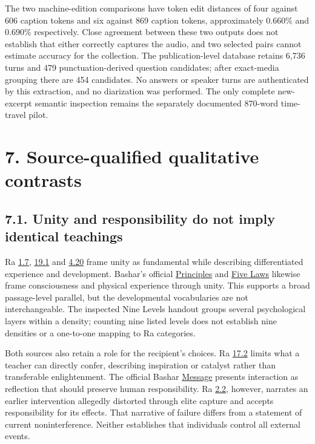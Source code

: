 \documentclass[
  11pt,
]{article}
\begin{document}
The two machine-edition comparisons have token edit distances of four
against 606 caption tokens and six against 869 caption tokens,
approximately 0.660\% and 0.690\% respectively. Close agreement between
these two outputs does not establish that either correctly captures the
audio, and two selected pairs cannot estimate accuracy for the
collection. The publication-level database retains 6,736 turns and 479
punctuation-derived question candidates; after exact-media grouping
there are 454 candidates. No answers or speaker turns are authenticated
by this extraction, and no diarization was performed. The only complete
new-excerpt semantic inspection remains the separately documented
870-word time-travel pilot.

\FloatBarrier

\section{7. Source-qualified qualitative
contrasts}\label{source-qualified-qualitative-contrasts}

\FloatBarrier

\subsection{7.1. Unity and responsibility do not imply identical
teachings}\label{unity-and-responsibility-do-not-imply-identical-teachings}

Ra \href{https://www.lawofone.info/s/1\#1.7}{1.7},
\href{https://www.lawofone.info/s/19\#19.1}{19.1} and
\href{https://www.lawofone.info/s/4\#4.20}{4.20} frame unity as
fundamental while describing differentiated experience and development.
Bashar's official \href{https://www.bashar.org/principles}{Principles}
and \href{https://www.bashar.org/fivelaws}{Five Laws} likewise frame
consciousness and physical experience through unity. This supports a
broad passage-level parallel, but the developmental vocabularies are not
interchangeable. The inspected Nine Levels handout groups several
psychological layers within a density; counting nine listed levels does
not establish nine densities or a one-to-one mapping to Ra categories.

Both sources also retain a role for the recipient's choices. Ra
\href{https://www.lawofone.info/s/17\#17.2}{17.2} limits what a teacher
can directly confer, describing inspiration or catalyst rather than
transferable enlightenment. The official Bashar
\href{https://www.bashar.org/message}{Message} presents interaction as
reflection that should preserve human responsibility. Ra
\href{https://www.lawofone.info/s/2\#2.2}{2.2}, however, narrates an
earlier intervention allegedly distorted through elite capture and
accepts responsibility for its effects. That narrative of failure
differs from a statement of current noninterference. Neither establishes
that individuals control all external events.
\end{document}
